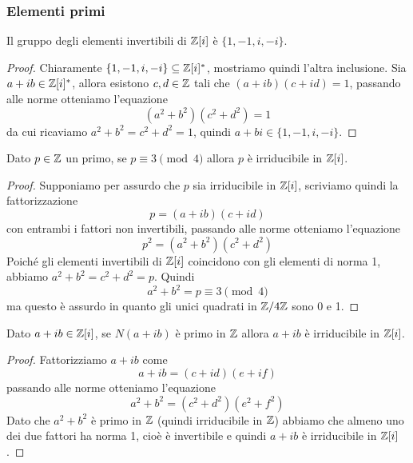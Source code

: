 \documentclass[11pt]{scrartcl}
\begin{document}
\subsubsection{Elementi primi}

\begin{lemma}
    Il gruppo degli elementi invertibili di $\mathbb Z[i]$ è $\{1, -1, i, -i\}$.
\end{lemma}

\begin{proof}
    Chiaramente $\{1, -1, i, -i\} \subseteq \mathbb Z[i]^*$, mostriamo quindi l'altra
    inclusione. Sia $a + ib \in \mathbb Z[i]^*$, allora esistono $c, d \in \mathbb Z$
    tali che $(a + ib)(c + id) = 1$, passando alle norme otteniamo l'equazione
    \[
        (a^2 + b^2)(c^2 + d^2) = 1
    \]
    da cui ricaviamo $a^2 + b^2 = c^2 + d^2 = 1$, quindi $a + bi \in \{1, -1, i, -i\}$.
\end{proof}

\begin{lemma}
    \label{lemma2.13}
    Dato $p \in \mathbb Z$ un primo, se $p \equiv 3 \pmod 4$ allora $p$ è irriducibile
    in $\mathbb Z[i]$.
\end{lemma}

\begin{proof}
    Supponiamo per assurdo che $p$ sia irriducibile in $\mathbb Z[i]$, scriviamo quindi
    la fattorizzazione
    \[
        p = (a + ib)(c + id)
    \]
    con entrambi i fattori non invertibili, passando alle norme otteniamo 
    l'equazione
    \[
        p^2 = (a^2 + b^2)(c^2 + d^2)
    \]
    Poiché gli elementi invertibili di $\mathbb Z[i]$ coincidono con gli elementi di 
    norma 1, abbiamo $a^2 + b^2 = c^2 + d^2 = p$. Quindi 
    \[
        a^2 + b^2 = p \equiv 3 \pmod 4
    \]
    ma questo è assurdo in quanto gli unici quadrati in $\mathbb{Z}/{4}\mathbb{Z}$ sono 0 e 1.
\end{proof}

\begin{lemma}
    \label{lemma2.14}
    Dato $a + ib \in \mathbb Z[i]$, se $N(a + ib)$ è primo in $\mathbb Z$ allora $a + ib$
    è irriducibile in $\mathbb Z[i]$.
\end{lemma}

\begin{proof}
    Fattorizziamo $a + ib$ come 
    \[
        a + ib = (c + id)(e + if)
    \]
    passando alle norme otteniamo l'equazione
    \[
        a^2 + b^2 = (c^2 + d^2)(e^2 + f^2)
    \]
    Dato che $a^2 + b^2$ è primo in $\mathbb Z$ (quindi irriducibile in $\mathbb Z$)
    abbiamo che almeno uno dei due fattori ha norma 1, cioè è invertibile e 
    quindi $a + ib$ è irriducibile in $\mathbb Z[i]$.
\end{proof}
\end{document}
